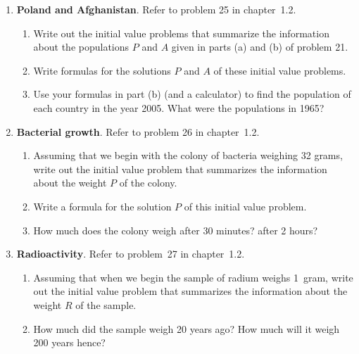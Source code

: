 \begin{enumerate}
\item {\bf Poland and Afghanistan}.  Refer to problem 25 in chapter~1.2.

  \begin{enumerate}
  \item Write out the initial value problems that summarize the information about the populations $P$ and $A$ given in parts (a) and (b) of problem 21.

  \item Write formulas for the solutions $P$ and $A$ of these initial value problems.

  \item Use your formulas in part (b) (and a calculator) to find the population of each country in the year 2005.  What were the populations in 1965?



\end{enumerate}
\item {\bf Bacterial growth}. Refer to problem
26 in chapter~1.2.

  \begin{enumerate}
  \item Assuming that we begin with the colony of bacteria weighing 32 grams, write out the initial value problem that summarizes the information about the weight $P$ of the colony.

  \item Write a formula for the solution $P$ of this initial value problem.

  \item How much does the colony weigh after 30 minutes?  after 2 hours?



\end{enumerate}
\item {\bf Radioactivity}.  Refer to problem~27 in chapter~1.2.

  \begin{enumerate}
  \item Assuming that when we begin the sample of radium weighs 1~gram,  write out the initial value problem that summarizes the information about the weight $R$ of the sample.

  \item How much did the sample weigh 20 years ago?  How much will it weigh 200 years hence?




\end{enumerate}
\end{enumerate}
